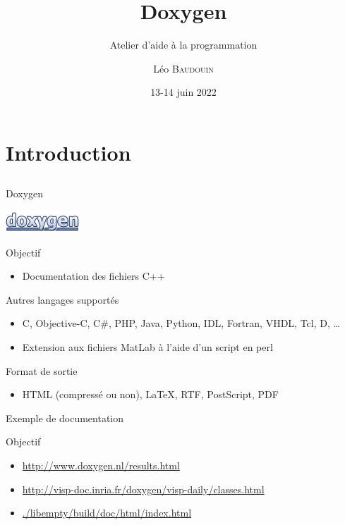 \documentclass{beamer}
\title{Doxygen}
\subtitle{Atelier d'aide à la programmation}
\author{L\'eo \textsc{Baudouin}}
\institute{
  {\url{baudouin.leo @ gmail.com}}
}
\date{13-14 juin 2022}
\begin{document}
\begin{frame}
  \titlepage
\end{frame}

\section{Introduction}
\subsection{}

\begin{frame}{Doxygen}

\begin{center}
\includegraphics[width=0.3\linewidth]{images/doxygen-logo}
\end{center}

\begin{exampleblock}{Objectif}
\begin{itemize}
\item Documentation des fichiers C++
\end{itemize}
\end{exampleblock}

\begin{block}{Autres langages supportés}
\begin{itemize}
\item C, Objective-C, C\#, PHP, Java, Python, IDL, Fortran, VHDL, Tcl, D, \dots
\item Extension aux fichiers MatLab à l'aide d'un script en perl
\end{itemize}
\end{block}

\begin{block}{Format de sortie}
\begin{itemize}
\item HTML (compressé ou non), \LaTeX, RTF, PostScript, PDF
\end{itemize}
\end{block}
\end{frame}


\begin{frame}{Exemple de documentation}
\begin{block}{Objectif}
\begin{itemize}
\item \url{http://www.doxygen.nl/results.html}
\item \url{http://visp-doc.inria.fr/doxygen/visp-daily/classes.html}
\item \url{./libempty/build/doc/html/index.html}
\end{itemize}
\end{block}
\end{frame}
\end{document}
